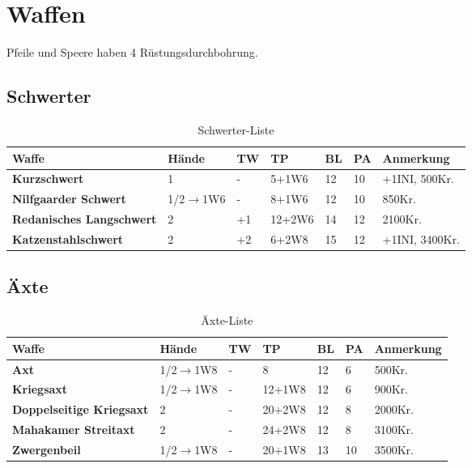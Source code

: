 {\let\clearpage\relax\chapter{Waffen}}
Pfeile und Speere haben 4 Rüstungsdurchbohrung.

\section{Schwerter}
\begin{table}[h]
\begin{center}
\begin{tabular}{|l|l|l|l|l|l|l|}
\hline
\textbf{Waffe} & \textbf{Hände} & \textbf{TW} & \textbf{TP} & \textbf{BL} & \textbf{PA} & \textbf{Anmerkung} \\

\hline
\textbf{Kurzschwert} & 1 & - & 5+1W6 & 12 & 10 & +1INI, 500Kr. \\

\hline
\textbf{Nilfgaarder Schwert} & 1/2$ \rightarrow $1W6 & - & 8+1W6 & 12 & 10 & 850Kr. \\

\hline
\textbf{Redanisches Langschwert} & 2 & +1 & 12+2W6 & 14 & 12 & 2100Kr. \\

\hline
\textbf{Katzenstahlschwert} & 2 & +2 & 6+2W8 & 15 & 12 & +1INI, 3400Kr. \\

\hline
\end{tabular}
\end{center}
\caption{Schwerter-Liste}
\label{tab:Schwerter}
\end{table}


\section{Äxte}
\begin{table}[h]
\begin{center}
\begin{tabular}{|p{3.5cm}|l|l|l|l|l|p{2.5cm}|}
\hline
\textbf{Waffe} & \textbf{Hände} & \textbf{TW} & \textbf{TP} & \textbf{BL} & \textbf{PA} & \textbf{Anmerkung} \\

\hline
\textbf{Axt} & 1/2$ \rightarrow $1W8 & - & 8 & 12 & 6 & 500Kr. \\

\hline
\textbf{Kriegsaxt} & 1/2$ \rightarrow $1W8 & - & 12+1W8 & 12 & 6 & 900Kr. \\

\hline
\textbf{Doppelseitige Kriegsaxt} & 2 & - & 20+2W8 & 12 & 8 & 2000Kr. \\

\hline
\textbf{Mahakamer Streitaxt} & 2 & - & 24+2W8 & 12 & 8 & 3100Kr. \\

\hline
\textbf{Zwergenbeil} & 1/2$ \rightarrow $1W8 & - & 20+1W8 & 13 & 10 & 3500Kr. \\

\hline
\end{tabular}
\end{center}
\caption{Äxte-Liste}
\label{tab:Äxte}
\end{table}


